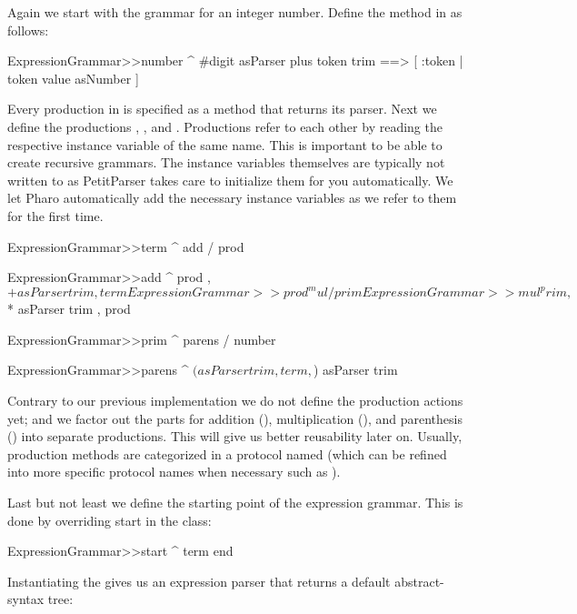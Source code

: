 \documentclass[a4paper,10pt,twoside]{book}
\begin{document}
Again we start with the grammar for an integer number. Define the
method  in  as follows:

\begin{code}{}
ExpressionGrammar>>number
   ^ #digit asParser plus token trim ==> [ :token | token value asNumber ]
\end{code}

Every production in  is specified as a method
that returns its parser. Next we define the productions ,
, and . Productions refer to each other by reading
the respective instance variable of the same name. This is important
to be able to create recursive grammars. The instance variables
themselves are typically not written to as PetitParser takes care to
initialize them for you automatically. We let Pharo automatically add
the necessary instance variables as we refer to them for the first
time.

\begin{code}{}
ExpressionGrammar>>term
   ^ add / prod

ExpressionGrammar>>add
   ^ prod , $+ asParser trim , term

ExpressionGrammar>>prod
   ^ mul / prim

ExpressionGrammar>>mul
   ^ prim , $* asParser trim , prod

ExpressionGrammar>>prim
   ^ parens / number

ExpressionGrammar>>parens
   ^ $( asParser trim , term , $) asParser trim
\end{code}

Contrary to our previous implementation we do not define the
production actions yet; and we factor out the parts for addition
(), multiplication (), and parenthesis ()
into separate productions. This will give us better reusability later
on. Usually, production methods are categorized in a protocol named
 (which can be refined into more specific protocol names
when necessary such as ).

Last but not least we define the starting point of the expression
grammar. This is done by overriding start in the
 class:

\begin{code}{}
ExpressionGrammar>>start
   ^ term end
\end{code}

Instantiating the  gives us an expression parser
that returns a default abstract-syntax tree:
\end{document}
